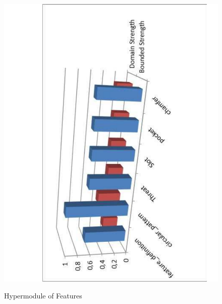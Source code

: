 \begin{figure}
	\centering
	\scriptsize
	\begin{minipage}{.50\textwidth}
		\includegraphics[scale=0.35, angle=-90]{figure-chapterIV/fig4-22.pdf}\\
		\caption{Hypermodule of Features}
		\label{figure4-22}
	\end{minipage}%
	\begin{minipage}{.50\textwidth}

\end{minipage}
\end{figure}
